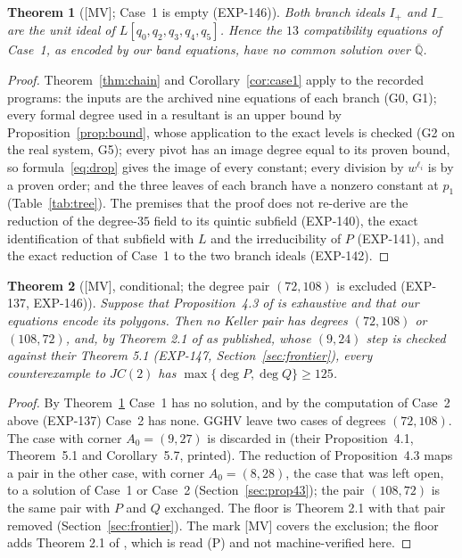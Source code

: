 \documentclass[11pt]{article}
\newtheorem{theorem}{Theorem}[section]
\theoremstyle{remark}
\newcommand{\Q}{\mathbb{Q}}
\begin{document}


\begin{theorem}[{[MV]}; Case~1 is empty (EXP-146)]\label{thm:case1}
Both branch ideals $I_+$ and $I_-$ are the unit ideal of $L[q_0,q_2,q_3,q_4,q_5]$. Hence the $13$ compatibility equations of Case~1, as encoded by our band equations, have no common solution over $\overline{\Q}$.
\end{theorem}
\begin{proof}
Theorem~\ref{thm:chain} and Corollary~\ref{cor:case1} apply to the recorded programs: the inputs are the archived nine equations of each branch (G0, G1); every formal degree used in a resultant is an upper bound by Proposition~\ref{prop:bound}, whose application to the exact levels is checked (G2 on the real system, G5); every pivot has an image degree equal to its proven bound,
so formula~\eqref{eq:drop} gives the image of every constant; every division by $w^{\ell_i}$ is by a proven order; and the three leaves of each branch have a nonzero constant at $p_1$ (Table~\ref{tab:tree}). The premises that the proof does not re-derive are the reduction of the degree-$35$ field to its quintic subfield (EXP-140), the exact identification of that subfield with $L$ and the irreducibility of $P$ (EXP-141), and the exact reduction of Case~1 to the two branch ideals (EXP-142).
\end{proof}

\begin{theorem}[{[MV], conditional}; the degree pair $(72,108)$ is excluded (EXP-137, EXP-146)]\label{thm:exclusion}
Suppose that Proposition~4.3 of \cite{GGHV2022} is exhaustive and that our equations encode its polygons. Then no Keller pair has degrees $(72,108)$ or $(108,72)$, and, by Theorem 2.1 of \cite{GGHV2022} as published, whose $(9,24)$ step is checked against their Theorem 5.1 (EXP-147, Section~\ref{sec:frontier}), every counterexample to $JC(2)$ has $\max\{\deg P,\deg Q\}\ge125$.
\end{theorem}
\begin{proof}
By Theorem~\ref{thm:case1} Case~1 has no solution, and by the computation of Case~2 above (EXP-137) Case~2 has none. GGHV leave two cases of degrees $(72,108)$. The case with corner $A_0=(9,27)$ is discarded in \cite{GGHV2022} (their Proposition~4.1, Theorem~5.1 and Corollary~5.7, printed). The reduction of Proposition~4.3 maps a pair in the other case, with corner $A_0=(8,28)$, the case that was left open, to a solution of Case~1 or Case~2 (Section~\ref{sec:prop43}); the pair $(108,72)$ is the same pair with $P$ and $Q$ exchanged. The floor is Theorem 2.1 with that pair removed (Section~\ref{sec:frontier}). The mark [MV] covers the exclusion; the floor adds Theorem 2.1 of \cite{GGHV2022}, which is read (P) and not machine-verified here.
\end{proof}
\end{document}
